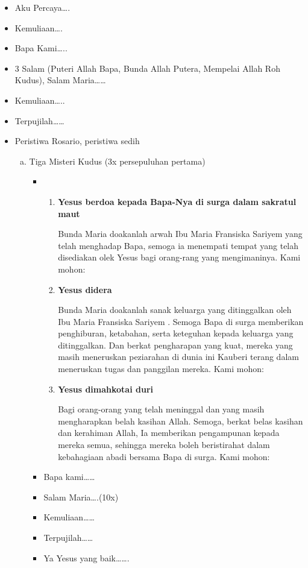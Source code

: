 \documentclass[a5paper,titlepage,12pt]{scrbook}
\newcommand{\arwah}{Ibu Maria Fransiska Sariyem }
\begin{document}
\begin{itemize}
	\item Aku Percaya{\dots}.
	\item Kemuliaan{\dots}.
	\item Bapa Kami{\dots}..
	\item 3 Salam (Puteri Allah Bapa, Bunda Allah Putera, Mempelai Allah Roh Kudus), Salam Maria{\dots}{\dots}
	\item Kemuliaan{\dots}..
	\item Terpujilah{\dots}{\dots}
	\item Peristiwa Rosario, peristiwa sedih 
	
	\begin{enumerate}[a.]
		\item Tiga Misteri Kudus (3x persepuluhan pertama)		
			\begin{itemize}
				\item 
				 	\begin{enumerate}
						\item \textbf{Yesus berdoa kepada Bapa-Nya di surga dalam sakratul maut}
						
Bunda Maria doakanlah arwah \arwah yang telah menghadap
Bapa, semoga ia menempati tempat yang telah disediakan olek Yesus bagi orang-rang yang
mengimaninya. Kami mohon:						
						
						\item \textbf{Yesus didera}
						
						Bunda Maria doakanlah sanak keluarga yang ditinggalkan oleh  \arwah. Semoga Bapa di surga memberikan penghiburan,
ketabahan, serta keteguhan kepada keluarga yang ditinggalkan.  Dan  berkat  pengharapan yang
kuat, mereka yang masih meneruskan peziarahan di dunia ini Kauberi terang dalam meneruskan
tugas dan panggilan mereka. Kami mohon:

						\item \textbf{Yesus dimahkotai duri}

Bagi orang-orang yang telah meninggal dan
yang masih mengharapkan belah kasihan Allah.
Semoga, berkat belas kasihan dan kerahiman
Allah, Ia memberikan pengampunan kepada mereka semua, 
sehingga mereka boleh beristirahat dalam kebahagiaan abadi bersama Bapa
di surga. Kami mohon:

					\end{enumerate}
				\item Bapa kami{\dots}{\dots}
				\item Salam Maria{\dots}.(10x)
				\item Kemuliaan{\dots}{\dots}
				\item Terpujilah{\dots}{\dots}
				\item Ya Yesus yang baik{\dots}{\dots}.
			\end{itemize}


\end{enumerate}
\end{itemize}
\end{document}
